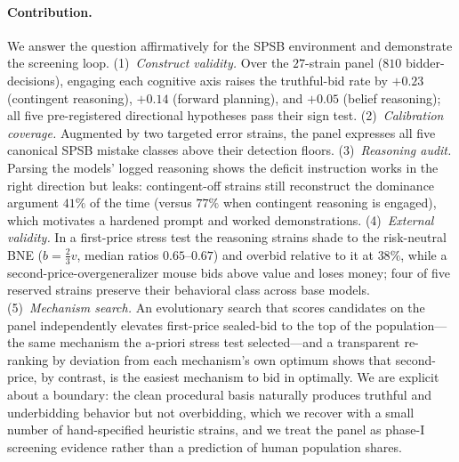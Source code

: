 \documentclass[12pt]{article}
\begin{document}
\paragraph{Contribution.} We answer the question affirmatively for the SPSB
environment and demonstrate the screening loop. (1)~\emph{Construct validity.}
Over the $27$-strain panel ($810$ bidder-decisions), engaging each cognitive axis
raises the truthful-bid rate by $+0.23$ (contingent reasoning), $+0.14$ (forward
planning), and $+0.05$ (belief reasoning); all five pre-registered directional
hypotheses pass their sign test. (2)~\emph{Calibration coverage.} Augmented by two
targeted error strains, the panel expresses all five canonical SPSB mistake
classes above their detection floors. (3)~\emph{Reasoning audit.} Parsing the
models' logged reasoning shows the deficit instruction works in the right
direction but leaks: contingent-off strains still reconstruct the dominance
argument $41\%$ of the time (versus $77\%$ when contingent reasoning is engaged),
which motivates a hardened prompt and worked demonstrations. (4)~\emph{External
validity.} In a first-price stress test the reasoning strains shade to the
risk-neutral BNE ($b=\tfrac23 v$, median ratios $0.65$--$0.67$) and overbid
relative to it at $38\%$, while a second-price-overgeneralizer mouse bids above
value and loses money; four of five reserved strains preserve their behavioral
class across base models. (5)~\emph{Mechanism search.} An evolutionary search that
scores candidates on the panel independently elevates first-price sealed-bid to
the top of the population---the same mechanism the a-priori stress test
selected---and a transparent re-ranking by deviation from each mechanism's own
optimum shows that second-price, by contrast, is the easiest mechanism to bid in
optimally. We are explicit about a boundary: the clean procedural basis naturally
produces truthful and underbidding behavior but not overbidding, which we recover
with a small number of hand-specified heuristic strains, and we treat the panel as
phase-I screening evidence rather than a prediction of human population shares.
\end{document}
